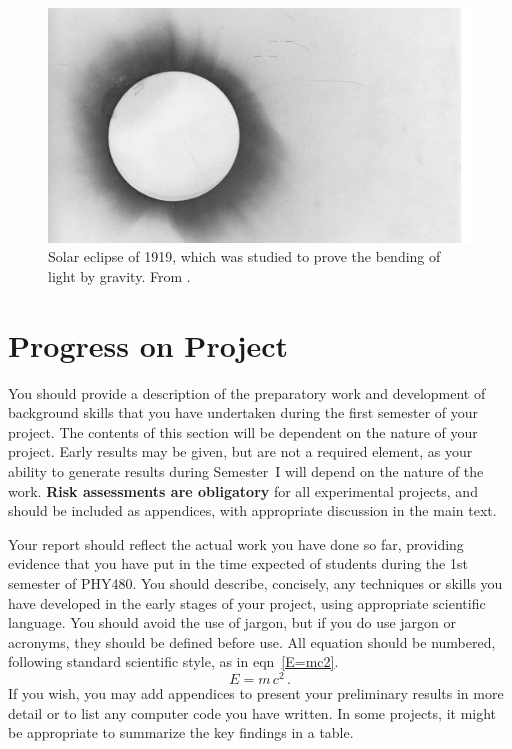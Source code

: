 \documentclass[a4paper,11pt]{article}
\begin{document}
\begin{figure}
\centering
\includegraphics[width=\textwidth]{Dyson.jpeg}
\caption{\label{fig:eclipse}Solar eclipse of 1919, which was studied to prove the bending of light by gravity. From \cite{Dyson}.}
\end{figure}





\section{Progress on Project}
You should provide a description of the preparatory work and development of background skills that you have undertaken during the first semester of your project. The contents of this section will be dependent on the nature of your project. Early results may be given, but are not a required element, as your ability to generate results during Semester~I will depend on the nature of the work. \textbf{Risk assessments are obligatory} for all experimental projects, and should be included as appendices, with appropriate discussion in the main text.

Your report should reflect the actual work you have done so far, providing evidence that you have put in the time expected of students during the 1st semester of PHY480. You should describe, concisely, any techniques or skills you have developed in the early stages of your project,
using appropriate scientific language. You should avoid the use of jargon, but if you do use jargon or acronyms, they should be defined before use. All equation should be numbered, following standard scientific style, as in eqn~\ref{E=mc2}.
\begin{equation}
\label{E=mc2}
E = m\,c^2 \, .
\end{equation}
If you wish, you may add appendices to present your preliminary results in more detail or to list any computer code you have written. In some projects, it might be appropriate to summarize the key findings in a table.
\end{document}
